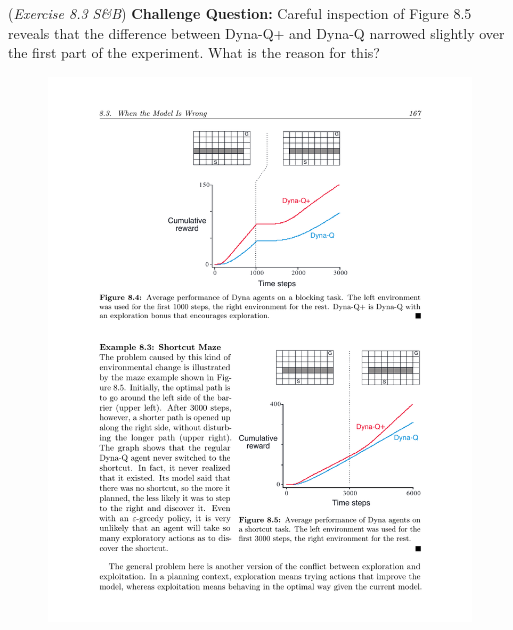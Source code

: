 (\textit{Exercise 8.3 S\&B})
\textbf{Challenge Question: }
Careful inspection of Figure 8.5 reveals that the difference between Dyna-Q+
and Dyna-Q narrowed slightly over the first part of the experiment.
What is the reason for this?
\begin{figure}[h!]
  \center
\includegraphics[width=0.5\linewidth]{figures/c2m4_fig_8dot5.pdf}
\end{figure}
